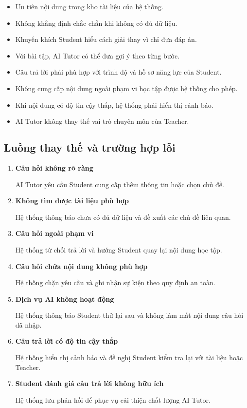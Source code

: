 \begin{itemize}
	\item Ưu tiên nội dung trong kho tài liệu của hệ thống.
	
	\item Không khẳng định chắc chắn khi không có đủ dữ liệu.
	
	\item Khuyến khích Student hiểu cách giải thay vì chỉ đưa đáp án.
	
	\item Với bài tập, AI Tutor có thể đưa gợi ý theo từng bước.
	
	\item Câu trả lời phải phù hợp với trình độ và hồ sơ năng lực của
	Student.
	
	\item Không cung cấp nội dung ngoài phạm vi học tập được hệ thống cho
	phép.
	
	\item Khi nội dung có độ tin cậy thấp, hệ thống phải hiển thị cảnh báo.
	
	\item AI Tutor không thay thế vai trò chuyên môn của Teacher.
\end{itemize}

\subsection{Luồng thay thế và trường hợp lỗi}

\begin{enumerate}[label=\textbf{A\arabic*.}]
	\item \textbf{Câu hỏi không rõ ràng}
	
	AI Tutor yêu cầu Student cung cấp thêm thông tin hoặc chọn chủ đề.
	
	\item \textbf{Không tìm được tài liệu phù hợp}
	
	Hệ thống thông báo chưa có đủ dữ liệu và đề xuất các chủ đề liên quan.
	
	\item \textbf{Câu hỏi ngoài phạm vi}
	
	Hệ thống từ chối trả lời và hướng Student quay lại nội dung học tập.
	
	\item \textbf{Câu hỏi chứa nội dung không phù hợp}
	
	Hệ thống chặn yêu cầu và ghi nhận sự kiện theo quy định an toàn.
	
	\item \textbf{Dịch vụ AI không hoạt động}
	
	Hệ thống thông báo Student thử lại sau và không làm mất nội dung câu
	hỏi đã nhập.
	
	\item \textbf{Câu trả lời có độ tin cậy thấp}
	
	Hệ thống hiển thị cảnh báo và đề nghị Student kiểm tra lại với tài
	liệu hoặc Teacher.
	
	\item \textbf{Student đánh giá câu trả lời không hữu ích}
	
	Hệ thống lưu phản hồi để phục vụ cải thiện chất lượng AI Tutor.
\end{enumerate}


